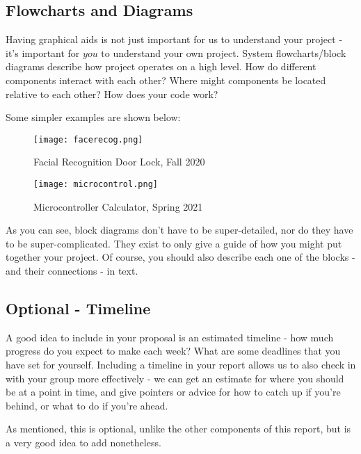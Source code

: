 \documentclass{article}
\begin{document}
\newpage

\subsection{Flowcharts and Diagrams}

Having graphical aids is not just important for us to understand your project - it's important for $\textit{you}$ to understand your own project. System flowcharts/block diagrams describe how project operates on a high level. How do different components interact with each other? Where might components be located relative to each other? How does your code work?

\vspace{5mm}

Some simpler examples are shown below:

\begin{figure}[h!]
\centering
\texttt{[image: facerecog.png]}
\caption*{Facial Recognition Door Lock, Fall 2020}
\end{figure}


\begin{figure}[h!]
\centering
\texttt{[image: microcontrol.png]}
\caption*{Microcontroller Calculator, Spring 2021}
\end{figure}

As you can see, block diagrams don't have to be super-detailed, nor do they have to be super-complicated. They exist to only give a guide of how you might put together your project. Of course, you should also describe each one of the blocks - and their connections - in text. 

\newpage

\subsection{Optional - Timeline}

A good idea to include in your proposal is an estimated timeline - how much progress do you expect to make each week? What are some deadlines that you have set for yourself. Including a timeline in your report allows us to also check in with your group more effectively - we can get an estimate for where you should be at a point in time, and give pointers or advice for how to catch up if you're behind, or what to do if you're ahead.

\vspace{5mm}

As mentioned, this is optional, unlike the other components of this report, but is a very good idea to add nonetheless.
\end{document}
